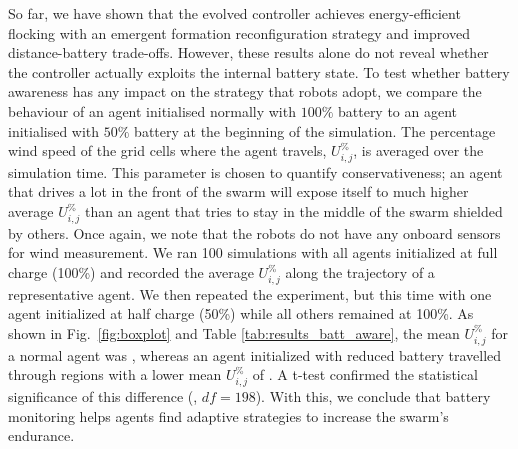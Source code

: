 So far, we have shown that the evolved controller achieves energy-efficient flocking with an emergent formation reconfiguration strategy and improved distance-battery trade-offs. However, these results alone do not reveal whether the controller actually exploits the internal battery state. To test whether battery awareness has any impact on the strategy that robots adopt, we compare the behaviour of an agent initialised normally with $100\%$ battery to an agent initialised with $50\%$ battery at the beginning of the simulation. The percentage wind speed of the grid cells where the agent travels, $U_{i,j}^\%$, is averaged over the simulation time. This parameter is chosen to quantify conservativeness; an agent that drives a lot in the front of the swarm will expose itself to much higher average $U_{i,j}^\%$ than an agent that tries to stay in the middle of the swarm shielded by others. Once again, we note that the robots do not have any onboard sensors for wind measurement. We ran 100 simulations with all agents initialized at full charge (100\%) and recorded the average $U_{i,j}^\%$ along the trajectory of a representative agent. We then repeated the experiment, but this time with one agent initialized at half charge (50\%) while all others remained at 100\%. As shown in Fig.~\ref{fig:boxplot} and Table \ref{tab:results_batt_aware}, the mean $U_{i,j}^\%$ for a normal agent was , whereas an agent initialized with reduced battery travelled through regions with a lower mean $U_{i,j}^\%$ of . A t-test confirmed the statistical significance of this difference (, $df=198$).  With this, we conclude that battery monitoring helps agents find adaptive strategies to increase the swarm's endurance.

